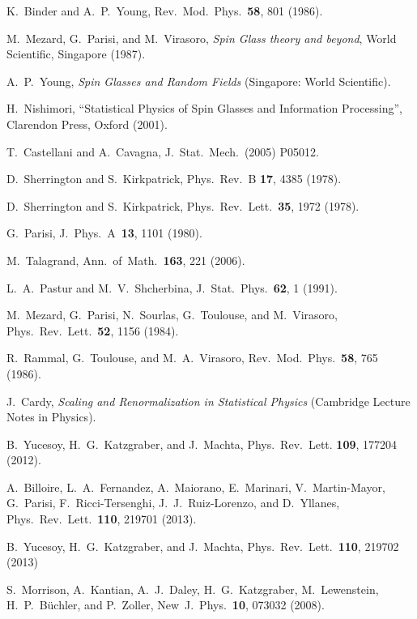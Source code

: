 \documentclass[twocolumn,superscriptaddress,prb,10pt]{revtex4-1}
\begin{document}
\begin{thebibliography}{99}
K.~Binder and A.~P.~Young, Rev.\ Mod.\ Phys.\ {\bf 58}, 801 (1986).

M.~Mezard, G.~Parisi, and M.~Virasoro, \emph{Spin Glass theory and beyond}, World Scientific, Singapore (1987).

A.~P.~Young, \emph{Spin Glasses and Random Fields} (Singapore: World Scientific).


H.~Nishimori, ``Statistical Physics of Spin Glasses and Information Processing'', 
Clarendon Press, Oxford (2001).

T.~Castellani and A.~Cavagna, J.\ Stat.\ Mech.\ (2005) P05012. 

D.~Sherrington and S.~Kirkpatrick, Phys.\ Rev.\ B {\bf 17}, 4385 
(1978).

D.~Sherrington and S.~Kirkpatrick, Phys.\ Rev.\ Lett.\ {\bf 35}, 
1972 (1978).

G.~Parisi, J.\ Phys.\ A\ {\bf 13}, 1101 (1980). 

M.~Talagrand, Ann.\ of\ Math.\ {\bf 163}, 221 (2006). 

L.~A.~Pastur and M.~V.~Shcherbina, J.\ Stat.\ Phys.\ {\bf 62}, 1 (1991).

M.~Mezard, G.~Parisi, N.~Sourlas, G.~Toulouse, and M.~Virasoro, 
Phys.\ Rev.\ Lett.\ {\bf 52}, 1156 (1984). 

R.~Rammal, G.~Toulouse, and M.~A.~Virasoro, Rev.\ Mod.\ Phys.\ {\bf 58}, 765 
(1986).

J.~Cardy, \emph{Scaling and Renormalization in Statistical Physics} 
(Cambridge Lecture Notes in Physics). 

B.~Yucesoy, H.~G.~Katzgraber, and J.~Machta, Phys.\ Rev.\ Lett. {\bf 109}, 
177204 (2012).

A.~Billoire, L.~A.~Fernandez, A.~Maiorano, E.~Marinari, 
V.~Martin-Mayor, G.~Parisi, F.~Ricci-Tersenghi, J.~J.~Ruiz-Lorenzo, 
and D.~Yllanes, Phys.\ Rev.\ Lett.\ {\bf 110}, 219701 (2013).

B.~Yucesoy, H.~G.~Katzgraber, and J.~Machta, Phys.\ Rev.\ Lett.\ {\bf 110}, 
219702 (2013)

S.~Morrison, A.~Kantian, A.~J.~Daley, H.~G.~Katzgraber, M.~Lewenstein, 
H.~P.~B\"uchler, and P.~Zoller, New\ J.\ Phys.\ {\bf 10}, 
073032 (2008). 


\end{thebibliography}
\end{document}
